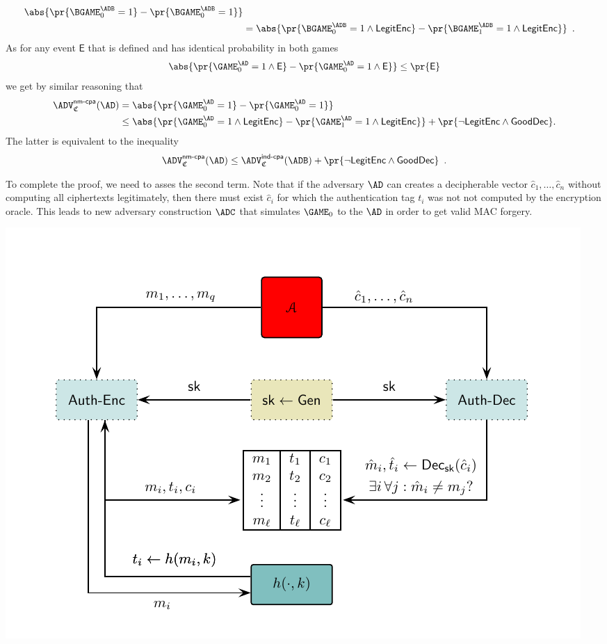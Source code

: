 \documentclass{crypto-exercise}
\newcommand{\ADVNMCPA}[2]{\ADV^{\mathsf{nm\text{-}cpa}}_{#1}{(#2)}}
\newcommand{\CS}{\mathfrak{C}}
\newcommand{\LENC}{\mathsf{LegitEnc}}
\newcommand{\GDEC}{\mathsf{GoodDec}}
\begin{document}
\begin{solution}
\begin{align*}
\abs{\pr{\BGAME_0^\ADB=1}-\pr{\BGAME_0^\ADB=1}}\\
&=\abs{\pr{\BGAME_0^\ADB=1\wedge\LENC}-\pr{\BGAME_1^\ADB=1\wedge\LENC}}\enspace.
\end{align*}
As for any event $\mathsf{E}$ that is defined and has identical probability in both games 
\begin{align*}
\abs{\pr{\GAME_0^\AD=1\wedge \mathsf{E}}-\pr{\GAME_0^\AD=1\wedge \mathsf{E}}}\leq \pr{\mathsf{E}}
\end{align*}
we get by similar reasoning that  
\begin{align*}
\ADVNMCPA{\CS}{\AD}&=
\abs{\pr{\GAME_0^\AD=1}-\pr{\GAME_0^\AD=1}}\\
&\leq\abs{\pr{\GAME_0^\AD=1\wedge\LENC}-\pr{\GAME_1^\AD=1\wedge\LENC}}
+\pr{\neg\LENC\wedge\GDEC}.
\end{align*}
The latter is equivalent to the inequality  
\begin{align*}
\ADVNMCPA{\CS}{\AD}\leq \ADVINDCPA{\CS}{\ADB} + \pr{\neg\LENC\wedge\GDEC} 
\enspace.
\end{align*}

To complete the proof, we need to asses the second term. Note that if the adversary $\AD$ can creates a decipherable vector $\hat{c}_1,\ldots, \hat{c}_n$ without computing all ciphertexts legitimately, then there must exist $\hat{c}_i$ for which the authentication tag $t_i$ was not not computed by the encryption oracle. This leads to new adversary construction $\ADC$ that simulates $\GAME_0$ to the $\AD$ in order to get valid MAC forgery.

\begin{center}
\includegraphics{figures/0604-decryption-simulator-for-mac}
\end{center}


\end{solution}
\end{document}
